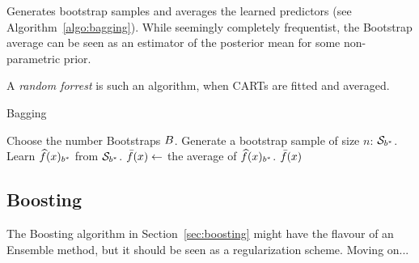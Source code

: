 Generates bootstrap samples and averages the learned predictors (see Algorithm~\ref{algo:bagging}). 
While seemingly completely frequentist, the Bootstrap average can be seen as an estimator of the posterior mean for some non-parametric prior.

A \emph{random forrest} is such an algorithm, when CARTs are fitted and averaged. 


\begin{algorithm}[H]
\caption{Bagging}
\label{algo:bagging}
\begin{algorithmic}
\State Choose the number Bootstraps $B$.
	\State Generate a bootstrap sample of size $n$: $\mathcal{S}_{b^*}$.
	\State Learn $\widehat{f}(x)_{{b^*}}$ from $\mathcal{S}_{b^*}$.
\EndFor
\State $\bar{f}(x) \gets$ the average of $\widehat{f}(x)_{{b^*}}$.
\State \Return $\bar{f}(x)$
\end{algorithmic}
\end{algorithm}





\subsection{Boosting}
The Boosting algorithm in Section~\ref{sec:boosting} might have the flavour of an Ensemble method, but it should be seen as a regularization scheme. Moving on...

